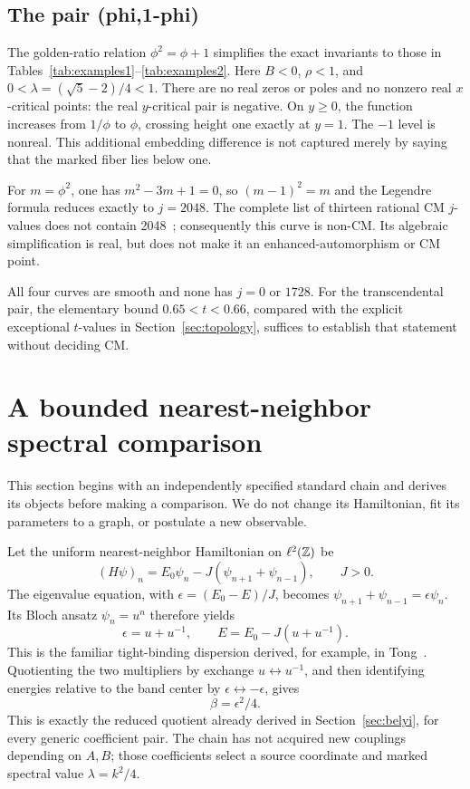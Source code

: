 \subsection{The pair (phi,1-phi)}
The golden-ratio relation \(\phi^2=\phi+1\) simplifies the exact invariants to those in Tables~\ref{tab:examples1}--\ref{tab:examples2}. Here \(B<0\), \(\rho<1\), and \(0<\lambda=(\sqrt5-2)/4<1\). There are no real zeros or poles and no nonzero real \(x\)-critical points: the real \(y\)-critical pair is negative. On \(y\ge0\), the function increases from \(1/\phi\) to \(\phi\), crossing height one exactly at \(y=1\). The \(-1\) level is nonreal. This additional embedding difference is not captured merely by saying that the marked fiber lies below one.

For \(m=\phi^2\), one has \(m^2-3m+1=0\), so \((m-1)^2=m\) and the Legendre formula reduces exactly to \(j=2048\). The complete list of thirteen rational CM \(j\)-values does not contain 2048~\cite[Introduction]{DLR}; consequently this curve is non-CM. Its algebraic simplification is real, but does not make it an enhanced-automorphism or CM point.

All four curves are smooth and none has \(j=0\) or \(1728\). For the transcendental pair, the elementary bound \(0.65<t<0.66\), compared with the explicit exceptional \(t\)-values in Section~\ref{sec:topology}, suffices to establish that statement without deciding CM.

\section{A bounded nearest-neighbor spectral comparison}\label{sec:physics}

This section begins with an independently specified standard chain and derives its objects before making a comparison. We do not change its Hamiltonian, fit its parameters to a graph, or postulate a new observable.

Let the uniform nearest-neighbor Hamiltonian on \(\ell^2(\mathbb Z)\) be
\begin{equation}\label{eq:chain}
(H\psi)_n=E_0\psi_n-J(\psi_{n+1}+\psi_{n-1}),\qquad J>0.
\end{equation}
The eigenvalue equation, with \(\epsilon=(E_0-E)/J\), becomes
\(\psi_{n+1}+\psi_{n-1}=\epsilon\psi_n\). Its Bloch ansatz \(\psi_n=u^n\) therefore yields
\begin{equation}\label{eq:dispersion}
\epsilon=u+u^{-1},\qquad E=E_0-J(u+u^{-1}).
\end{equation}
This is the familiar tight-binding dispersion derived, for example, in Tong~\cite[\S2.1.1, Eqs.~(2.1)--(2.5)]{Tong}. Quotienting the two multipliers by exchange \(u\leftrightarrow u^{-1}\), and then identifying energies relative to the band center by \(\epsilon\leftrightarrow-\epsilon\), gives
\begin{equation}\label{eq:spectralquotient}
\beta=\epsilon^2/4.
\end{equation}
This is exactly the reduced quotient already derived in Section~\ref{sec:belyi}, for every generic coefficient pair. The chain has not acquired new couplings depending on \(A,B\); those coefficients select a source coordinate and marked spectral value \(\lambda=k^2/4\).

